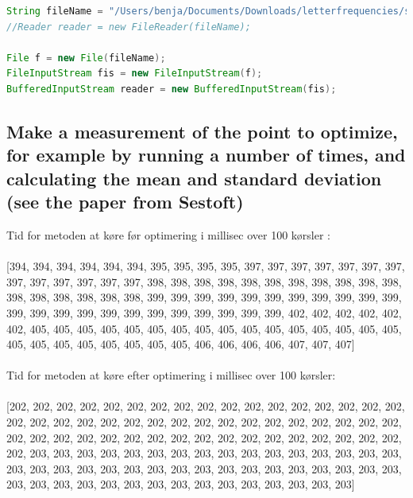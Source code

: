 \documentclass[12pt]{article}
\begin{document}
\lstset{style=mystyle}


\begin{lstlisting}[language=Java, caption=Optimised tallyChars]
String fileName = "/Users/benja/Documents/Downloads/letterfrequencies/src/main/resources/FoundationSeries.txt";
//Reader reader = new FileReader(fileName);

File f = new File(fileName);
FileInputStream fis = new FileInputStream(f);
BufferedInputStream reader = new BufferedInputStream(fis);

\end{lstlisting}


\newpage
\subsection{Make a measurement of the point to optimize, for example by running a number of times, and calculating the mean and standard deviation (see the paper from Sestoft)}

Tid for metoden at køre før optimering i millisec over 100 kørsler :
\\
\\

[394, 394, 394, 394, 394, 394, 395, 395, 395, 395, 397, 397, 397, 397, 397, 397, 397, 397, 397, 397, 397, 397, 397, 398, 398, 398, 398, 398, 398, 398, 398, 398, 398, 398, 398, 398, 398, 398, 398, 398, 399, 399, 399, 399, 399, 399, 399, 399, 399, 399, 399, 399, 399, 399, 399, 399, 399, 399, 399, 399, 399, 399, 399, 402, 402, 402, 402, 402, 402, 405, 405, 405, 405, 405, 405, 405, 405, 405, 405, 405, 405, 405, 405, 405, 405, 405, 405, 405, 405, 405, 405, 405, 405, 406, 406, 406, 406, 407, 407, 407]
\\
\\
Tid for metoden at køre efter optimering i millisec over 100 kørsler:
\\
\\

[202, 202, 202, 202, 202, 202, 202, 202, 202, 202, 202, 202, 202, 202, 202, 202, 202, 202, 202, 202, 202, 202, 202, 202, 202, 202, 202, 202, 202, 202, 202, 202, 202, 202, 202, 202, 202, 202, 202, 202, 202, 202, 202, 202, 202, 202, 202, 202, 202, 202, 202, 202, 203, 203, 203, 203, 203, 203, 203, 203, 203, 203, 203, 203, 203, 203, 203, 203, 203, 203, 203, 203, 203, 203, 203, 203, 203, 203, 203, 203, 203, 203, 203, 203, 203, 203, 203, 203, 203, 203, 203, 203, 203, 203, 203, 203, 203, 203, 203, 203]
\\
\\
\end{document}
